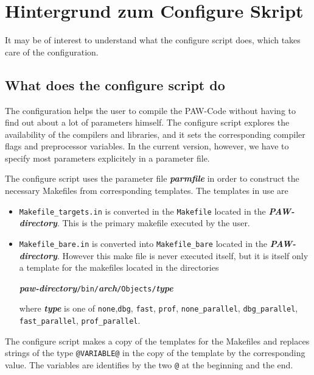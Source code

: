 \documentclass[a4paper,10pt]{report}
\newcommand{\myspec}[1]{\textbf{\textit{#1}}}
\newcommand{\mytt}[1]{{\tt #1}}
\begin{document}
\section{Hintergrund zum Configure Skript}
\label{sec:configurebackground}
It may be of interest to understand what the configure script does,
which takes care of the configuration.

\subsection{What does the configure script do}
The configuration helps the user to compile the PAW-Code without
having to find out about a lot of parameters himself.  The configure
script explores the availability of the compilers and libraries, and
it sets the corresponding compiler flags and preprocessor
variables. In the current version, however, we have to specify most
parameters explicitely in a parameter file.

The configure script uses the parameter file \myspec{parmfile} in
order to construct the necessary Makefiles from corresponding
templates. The templates in use are
\begin{itemize}
\item \mytt{Makefile\_targets.in} is converted in the \mytt{Makefile}
located in the \myspec{PAW-directory}. This is the primary makefile
executed by the user.
\item \mytt{Makefile\_bare.in} is converted into \mytt{Makefile\_bare}
located in the \myspec{PAW-directory}. However this make file is never
executed itself, but it is itself only a template for the makefiles located in the directories
\begin{center}
\myspec{paw-directory}\mytt{/bin/}\myspec{arch}\mytt{/Objects/}\myspec{type}
\end{center}
where \myspec{type} is one of \mytt{none},\mytt{dbg}, \mytt{fast},
\mytt{prof}, \mytt{none\_parallel}, \mytt{dbg\_parallel},
\mytt{fast\_parallel}, \mytt{prof\_parallel}.
\end{itemize}

The configure script makes a copy of the templates for the Makefiles
and replaces strings of the type \mytt{@VARIABLE@} in the copy of the
template by the corresponding value. The variables are identifies by
the two \mytt{@} at the beginning and the end.
\end{document}
